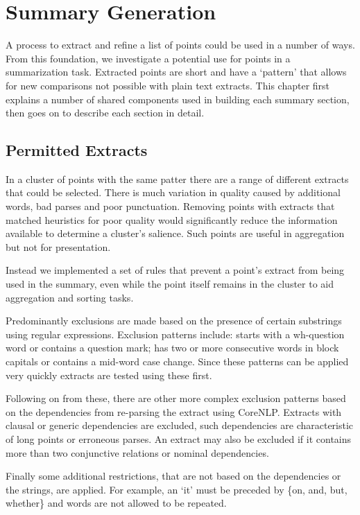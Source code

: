 \chapter{Summary Generation\label{chap:summary-generation}}
  A process to extract and refine a list of points could be used in a number of ways. From this foundation, we investigate a potential use for points in a summarization task. Extracted points are short and have a `pattern' that allows for new comparisons not possible with plain text extracts. This chapter first explains a number of shared components used in building each summary section, then goes on to describe each section in detail.

  \section{Permitted Extracts}
    In a cluster of points with the same patter there are a range of different extracts that could be selected. There is much variation in quality caused by additional words, bad parses and poor punctuation. Removing points with extracts that matched heuristics for poor quality would significantly reduce the information available to determine a cluster's salience. Such points are useful in aggregation but not for presentation.

    Instead we implemented a set of rules that prevent a point's extract from being used in the summary, even while the point itself remains in the cluster to aid aggregation and sorting tasks.

    Predominantly exclusions are made based on the presence of certain substrings using regular expressions. Exclusion patterns include: starts with a wh-question word or contains a question mark; has two or more consecutive words in block capitals or contains a mid-word case change. Since these patterns can be applied very quickly extracts are tested using these first.

    Following on from these, there are other more complex exclusion patterns based on the dependencies from re-parsing the extract using CoreNLP. Extracts with clausal or generic dependencies are excluded, such dependencies are characteristic of long points or erroneous parses. An extract may also be excluded if it contains more than two conjunctive relations or nominal dependencies.

    Finally some additional restrictions, that are not based on the dependencies or the strings, are applied. For example, an `it' must be preceded by \{on, and, but, whether\} and words are not allowed to be repeated.

